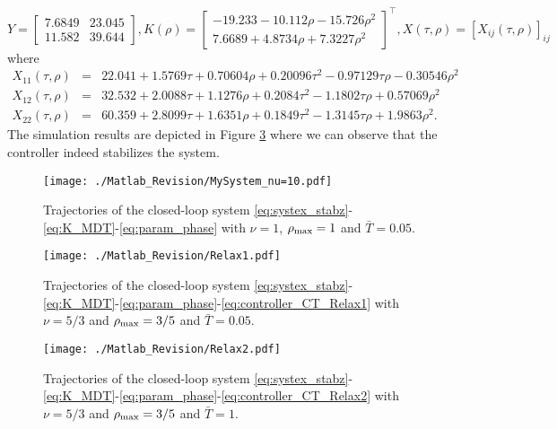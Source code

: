 \documentclass[12pt]{article}
\def\rmax{\rho_{\textnormal{max}}}
\def\T{\textnormal{T}}
\def\T{\intercal}
\begin{document}
{\begin{equation}\label{eq:controller_CT_Relax2}
  Y=\begin{bmatrix}
   7.6849& 23.045\\
   11.582 &39.644
  \end{bmatrix}, K(\rho)=\begin{bmatrix}
 -19.233-10.112\rho-15.726\rho^2\\
  7.6689+4.8734\rho+7.3227\rho^2
  \end{bmatrix}^{\T}, X(\tau,\rho)=[X_{ij}(\tau,\rho)]_{ij}
\end{equation}
where
\begin{equation}
  \begin{array}{rcl}
    X_{11}(\tau,\rho)&=&  22.041+1.5769\tau+0.70604\rho+0.20096\tau^2-0.97129\tau\rho-0.30546\rho^2\\
    X_{12}(\tau,\rho)&=& 32.532+2.0088\tau+1.1276\rho+0.2084\tau^2-1.1802\tau\rho+0.57069\rho^2\\
    X_{22}(\tau,\rho)&=& 60.359+2.8099\tau+1.6351\rho+0.1849\tau^2-1.3145\tau\rho+1.9863\rho^2.
  \end{array}
\end{equation}
The simulation results are depicted in Figure \ref{fig:mySystemCT_Relax2} where we can observe that the controller indeed stabilizes the system.}


 \begin{figure}
    \centering
    \texttt{[image: ./Matlab\_Revision/MySystem\_nu=10.pdf]}
    \caption{Trajectories of the closed-loop system \eqref{eq:systex_stabz}-\eqref{eq:K_MDT}-\eqref{eq:param_phase} with $\nu=1$, $\rmax=1$ and $\bar{T}=0.05$.}\label{fig:mySystemCT}
  \end{figure}

 \begin{figure}
    \centering
    \texttt{[image: ./Matlab\_Revision/Relax1.pdf]}
    \caption{Trajectories of the closed-loop system \eqref{eq:systex_stabz}-\eqref{eq:K_MDT}-\eqref{eq:param_phase}-\eqref{eq:controller_CT_Relax1} with $\nu=5/3$ and $\rmax=3/5$ and  $\bar{T}=0.05$.}\label{fig:mySystemCT_Relax1}
  \end{figure}


 \begin{figure}
    \centering
    \texttt{[image: ./Matlab\_Revision/Relax2.pdf]}
     \caption{Trajectories of the closed-loop system \eqref{eq:systex_stabz}-\eqref{eq:K_MDT}-\eqref{eq:param_phase}-\eqref{eq:controller_CT_Relax2} with $\nu=5/3$ and $\rmax=3/5$ and  $\bar{T}=1$.}\label{fig:mySystemCT_Relax2}
  \end{figure}
\end{document}
